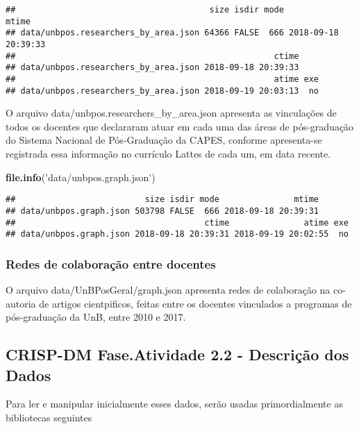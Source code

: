 \documentclass[]{article}
\newenvironment{Shaded}{\begin{snugshade}}{\end{snugshade}}
\newcommand{\KeywordTok}[1]{\textcolor[rgb]{0.13,0.29,0.53}{\textbf{#1}}}
\newcommand{\StringTok}[1]{\textcolor[rgb]{0.31,0.60,0.02}{#1}}
\newcommand{\NormalTok}[1]{#1}
\begin{document}
\begin{verbatim}
##                                       size isdir mode               mtime
## data/unbpos.researchers_by_area.json 64366 FALSE  666 2018-09-18 20:39:33
##                                                    ctime
## data/unbpos.researchers_by_area.json 2018-09-18 20:39:33
##                                                    atime exe
## data/unbpos.researchers_by_area.json 2018-09-19 20:03:13  no
\end{verbatim}

O arquivo data/unbpos.researchers\_by\_area.json apresenta as
vinculações de todos os docentes que declararam atuar em cada uma das
áreas de pós-graduação do Sistema Nacional de Pós-Graduação da CAPES,
conforme apresenta-se registrada essa informação no currículo Lattes de
cada um, em data recente.

\begin{Shaded}
\begin{Highlighting}[]
\KeywordTok{file.info}\NormalTok{(}\StringTok{'data/unbpos.graph.json'}\NormalTok{)}
\end{Highlighting}
\end{Shaded}

\begin{verbatim}
##                          size isdir mode               mtime
## data/unbpos.graph.json 503798 FALSE  666 2018-09-18 20:39:31
##                                      ctime               atime exe
## data/unbpos.graph.json 2018-09-18 20:39:31 2018-09-19 20:02:55  no
\end{verbatim}

\subsubsection{Redes de colaboração entre
docentes}\label{redes-de-colaboracao-entre-docentes}

O arquivo data/UnBPosGeral/graph.json apresenta redes de colaboração na
co-autoria de artigos cientpificos, feitas entre os docentes vinculados
a programas de pós-graduação da UnB, entre 2010 e 2017.

\subsection{CRISP-DM Fase.Atividade 2.2 - Descrição dos
Dados}\label{crisp-dm-fase.atividade-2.2---descricao-dos-dados}

Para ler e manipular inicialmente esses dados, serão usadas
primordialmente as bibliotecas seguintes
\end{document}
